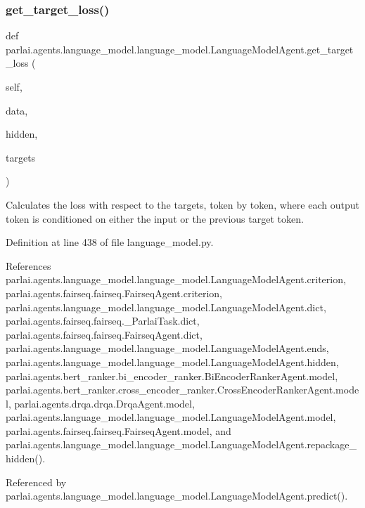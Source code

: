 \subsubsection{\texorpdfstring{get\+\_\+target\+\_\+loss()}{get\_target\_loss()}}
{\footnotesize\ttfamily def parlai.\+agents.\+language\+\_\+model.\+language\+\_\+model.\+Language\+Model\+Agent.\+get\+\_\+target\+\_\+loss (\begin{DoxyParamCaption}\item[{}]{self,  }\item[{}]{data,  }\item[{}]{hidden,  }\item[{}]{targets }\end{DoxyParamCaption})}

\begin{DoxyVerb}Calculates the loss with respect to the targets, token by token,
   where each output token is conditioned on either the input or the
   previous target token.
\end{DoxyVerb}
 

Definition at line 438 of file language\+\_\+model.\+py.



References parlai.\+agents.\+language\+\_\+model.\+language\+\_\+model.\+Language\+Model\+Agent.\+criterion, parlai.\+agents.\+fairseq.\+fairseq.\+Fairseq\+Agent.\+criterion, parlai.\+agents.\+language\+\_\+model.\+language\+\_\+model.\+Language\+Model\+Agent.\+dict, parlai.\+agents.\+fairseq.\+fairseq.\+\_\+\+Parlai\+Task.\+dict, parlai.\+agents.\+fairseq.\+fairseq.\+Fairseq\+Agent.\+dict, parlai.\+agents.\+language\+\_\+model.\+language\+\_\+model.\+Language\+Model\+Agent.\+ends, parlai.\+agents.\+language\+\_\+model.\+language\+\_\+model.\+Language\+Model\+Agent.\+hidden, parlai.\+agents.\+bert\+\_\+ranker.\+bi\+\_\+encoder\+\_\+ranker.\+Bi\+Encoder\+Ranker\+Agent.\+model, parlai.\+agents.\+bert\+\_\+ranker.\+cross\+\_\+encoder\+\_\+ranker.\+Cross\+Encoder\+Ranker\+Agent.\+model, parlai.\+agents.\+drqa.\+drqa.\+Drqa\+Agent.\+model, parlai.\+agents.\+language\+\_\+model.\+language\+\_\+model.\+Language\+Model\+Agent.\+model, parlai.\+agents.\+fairseq.\+fairseq.\+Fairseq\+Agent.\+model, and parlai.\+agents.\+language\+\_\+model.\+language\+\_\+model.\+Language\+Model\+Agent.\+repackage\+\_\+hidden().



Referenced by parlai.\+agents.\+language\+\_\+model.\+language\+\_\+model.\+Language\+Model\+Agent.\+predict().

